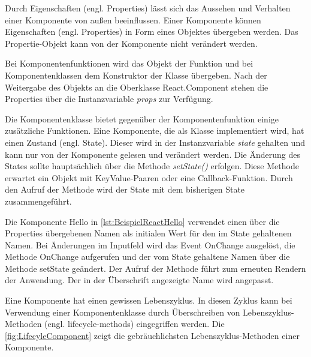 Durch Eigenschaften (engl. Properties) lässt sich das Aussehen und Verhalten einer Komponente von außen beeinflussen. Einer Komponente können Eigenschaften (engl. Properties) in Form eines Objektes übergeben werden. Das Propertie-Objekt kann von der Komponente nicht verändert werden. 

Bei Komponentenfunktionen wird das Objekt der Funktion und bei Komponentenklassen dem Konstruktor der Klasse übergeben. Nach der Weitergabe des Objekts an die Oberklasse React.Component stehen die Properties über die Instanzvariable \textit{props} zur Verfügung. \autocites[vgl.][24\psq,83-88]{Zeigermann.2016}[vgl.][12-17]{Stefanov.2017}


Die Komponentenklasse bietet gegenüber der Komponentenfunktion einige zusätzliche Funktionen. Eine  Komponente, die als Klasse implementiert wird, hat einen Zustand (engl. State). Dieser wird in der Instanzvariable \textit{state} gehalten und kann nur von der Komponente gelesen und verändert werden. Die Änderung des States sollte hauptsächlich über die Methode \textit{setState()} erfolgen. Diese Methode  erwartet ein Objekt mit KeyValue-Paaren oder eine Callback-Funktion. Durch den Aufruf der Methode wird der State mit dem bisherigen State zusammengeführt.\autocites[vgl.][24\psq,89-93]{Zeigermann.2016}[vgl.][17\psq]{Stefanov.2017} 

Die Komponente Hello in \autoref{lst:BeispielReactHello} verwendet einen über die Properties übergebenen Namen als initialen Wert für den im State gehaltenen Namen. Bei Änderungen im Inputfeld wird das Event OnChange ausgelöst, die Methode OnChange aufgerufen und der vom State gehaltene Namen über die Methode setState geändert. Der Aufruf der Methode führt zum erneuten Rendern der Anwendung. Der in der Überschrift angezeigte Name wird angepasst.

Eine Komponente hat einen gewissen Lebenszyklus. In diesen Zyklus kann bei Verwendung einer Komponentenklasse durch Überschreiben von Lebenszyklus-Methoden (engl. lifecycle-methods) eingegriffen werden. Die \autoref{fig:LifecyleComponent} zeigt die gebräuchlichsten Lebenszyklus-Methoden einer Komponente.\autocites[vgl.][96-100]{Zeigermann.2016}[vgl.][]{Facebook.2018b}

